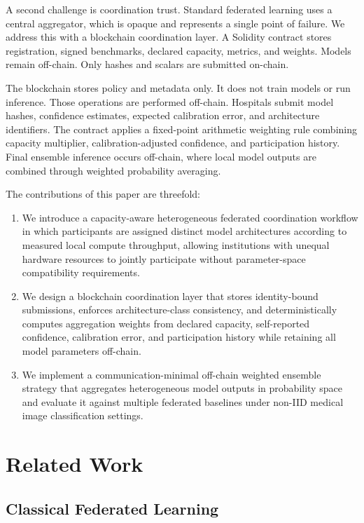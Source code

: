 \documentclass[conference]{IEEEtran}
\begin{document}
A second challenge is coordination trust. Standard federated learning uses a central aggregator, which is opaque and represents a single point of failure. We address this with a blockchain coordination layer. A Solidity contract stores registration, signed benchmarks, declared capacity, metrics, and weights. Models remain off-chain. Only hashes and scalars are submitted on-chain.

The blockchain stores policy and metadata only. It does not train models or run inference. Those operations are performed off-chain. Hospitals submit model hashes, confidence estimates, expected calibration error, and architecture identifiers. The contract applies a fixed-point arithmetic weighting rule combining capacity multiplier, calibration-adjusted confidence, and participation history. Final ensemble inference occurs off-chain, where local model outputs are combined through weighted probability averaging.

The contributions of this paper are threefold:

\begin{enumerate}
\item We introduce a capacity-aware heterogeneous federated coordination workflow in which participants are assigned distinct model architectures according to measured local compute throughput, allowing institutions with unequal hardware resources to jointly participate without parameter-space compatibility requirements.

\item We design a blockchain coordination layer that stores identity-bound submissions, enforces architecture-class consistency, and deterministically computes aggregation weights from declared capacity, self-reported confidence, calibration error, and participation history while retaining all model parameters off-chain.

\item We implement a communication-minimal off-chain weighted ensemble strategy that aggregates heterogeneous model outputs in probability space and evaluate it against multiple federated baselines under non-IID medical image classification settings.

\end{enumerate}

\section{Related Work}

\subsection{Classical Federated Learning}
\end{document}
